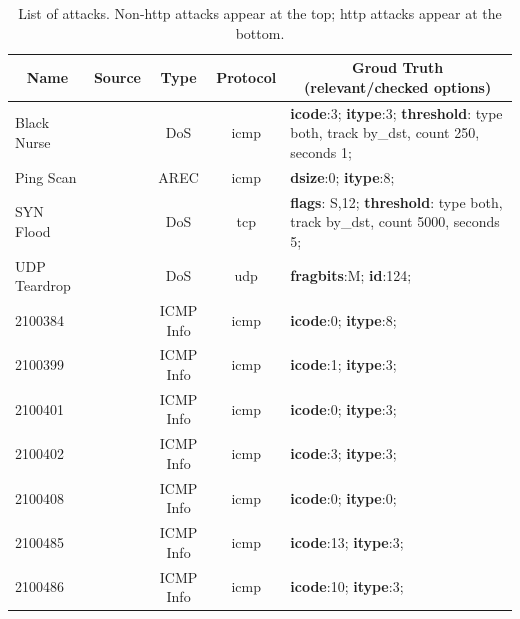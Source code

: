 \documentclass[conference]{IEEEtran}
\begin{document}
\begin{table}[t!]
  \footnotesize
  \caption{\label{table:attacks}List of attacks. Non-http attacks
    appear at the top; http attacks appear at the bottom.}
  \vspace{-2ex}
  \centering
  \setlength{\tabcolsep}{4.5pt}
  \renewcommand{\arraystretch}{0.35}
  \begin{tabular}{lcccp{11cm}}
    \toprule
    \multicolumn{1}{c}{Name} &
    \multicolumn{1}{c}{Source} &
    \multicolumn{1}{c}{Type} &
    \multicolumn{1}{c}{Protocol} &
    \multicolumn{1}{c}{Groud Truth (relevant/checked options)} \\
    \midrule
    Black Nurse & \cite{pcap-attacks} & DoS & icmp & \textbf{icode}:3; \textbf{itype}:3; \textbf{threshold}: type both, track by\_dst, count 250, seconds 1;\\    
    Ping Scan & \cite{netmap} & AREC & icmp & \textbf{dsize}:0; \textbf{itype}:8; \\
    SYN Flood & \cite{hping3} & DoS & tcp & \textbf{flags}: S,12;
    \textbf{threshold}: type both, track by\_dst, count 5000, seconds 5;\\
    UDP Teardrop & \cite{udp-teardrop-source} & DoS & udp & \textbf{fragbits}:M; \textbf{id}:124; \\
      2100384 & \cite{iscx} & ICMP Info & icmp & \textbf{icode}:0; \textbf{itype}:8; \\
      2100399 & \cite{iscx} & ICMP Info & icmp & \textbf{icode}:1; \textbf{itype}:3; \\
      2100401 & \cite{iscx} & ICMP Info & icmp & \textbf{icode}:0; \textbf{itype}:3; \\
      2100402 & \cite{iscx} & ICMP Info & icmp & \textbf{icode}:3; \textbf{itype}:3; \\
      2100408 & \cite{iscx} & ICMP Info & icmp & \textbf{icode}:0; \textbf{itype}:0; \\
      2100485 & \cite{iscx} & ICMP Info & icmp & \textbf{icode}:13; \textbf{itype}:3; \\
      2100486 & \cite{iscx} & ICMP Info & icmp & \textbf{icode}:10; \textbf{itype}:3; \\
    \midrule

\end{tabular}
\end{table}
\end{document}
